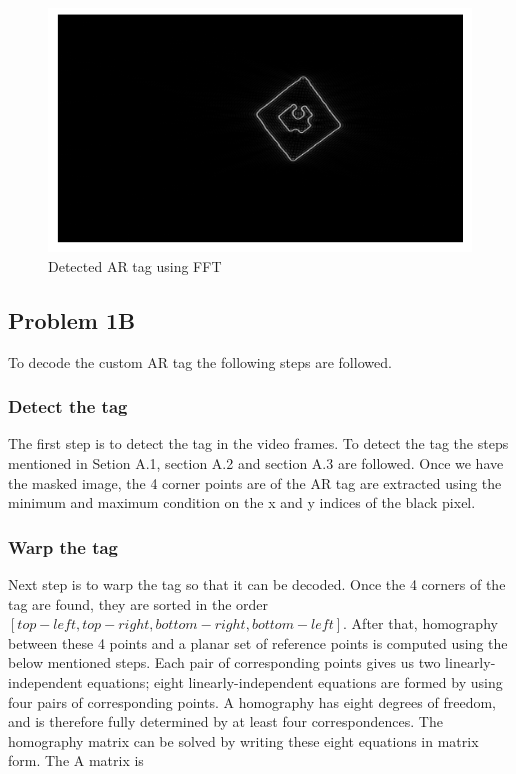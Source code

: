 \documentclass[conference]{IEEEtran}
\begin{document}
\begin{figure}[H]
\includegraphics[scale=0.45]{./Images/ARTag_edges.png}
\centering
\caption{Detected AR tag using FFT}
\end{figure}
\subsection{Problem 1B}
To decode the custom AR tag the following steps are followed.
\subsubsection{Detect the tag}
The first step is to detect the tag in the video frames. To detect the tag the steps mentioned in Setion A.1, section A.2 and section A.3 are followed. Once we have the masked image, the 4 corner points are of the AR tag are extracted using the minimum and maximum condition on the x and y indices of the black pixel. 
\subsubsection{Warp the tag}
Next step is to warp the tag so that it can be decoded. Once the 4 corners of the tag are found, they are sorted in the order $[top-left, top-right, bottom-right, bottom-left]$. After that, homography between these 4 points and a planar set of reference points is computed using the below mentioned steps.
Each pair of corresponding points gives us two linearly-independent equations;
eight linearly-independent equations are formed by using four pairs of corresponding points. A homography has eight degrees of freedom, and is therefore fully determined by at least four correspondences. The homography matrix can be solved by writing these eight equations in matrix form. The A matrix is 
\\
\end{document}
